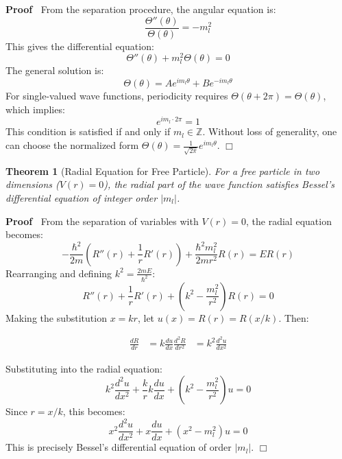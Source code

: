 \documentclass{article}
\newenvironment{proof}{\noindent\textbf{Proof\ }}{\hspace*{\fill}$\Box$\medskip}
\newtheorem{theorem}{Theorem}
\begin{document}
\begin{proof}
  From the separation procedure, the angular equation is:
  \begin{equation}
    \frac{\Theta'' (\theta)}{\Theta (\theta)} = - m_l^2
  \end{equation}
  This gives the differential equation:
  \begin{equation}
    \Theta'' (\theta) + m_l^2 \Theta (\theta) = 0
  \end{equation}
  The general solution is:
  \begin{equation}
    \Theta (\theta) = Ae^{im_l \theta} + Be^{- im_l \theta}
  \end{equation}
  For single-valued wave functions, periodicity requires $\Theta (\theta + 2
  \pi) = \Theta (\theta)$, which implies:
  \begin{equation}
    e^{im_l \cdot 2 \pi} = 1
  \end{equation}
  This condition is satisfied if and only if $m_l \in \mathbb{Z}$. Without
  loss of generality, one can choose the normalized form $\Theta (\theta) =
  \frac{1}{\sqrt{2 \pi}} e^{im_l \theta}$.
\end{proof}

\begin{theorem}
  [Radial Equation for Free Particle] For a free particle in two dimensions
  ($V (r) = 0$), the radial part of the wave function satisfies Bessel's
  differential equation of integer order $|m_l |$.
\end{theorem}

\begin{proof}
  From the separation of variables with $V (r) = 0$, the radial equation
  becomes:
  \begin{equation}
    - \frac{\hbar^2}{2 m}  \left( R'' (r) + \frac{1}{r} R' (r) \right) +
    \frac{\hbar^2 m_l^2}{2 mr^2} R (r) = ER (r)
  \end{equation}
  Rearranging and defining $k^2 = \frac{2 mE}{\hbar^2}$:
  \begin{equation}
    R'' (r) + \frac{1}{r} R' (r) + \left( k^2 - \frac{m_l^2}{r^2} \right) R
    (r) = 0
  \end{equation}
  Making the substitution $x = kr$, let $u (x) = R (r) = R (x / k)$. Then:
  
  \begin{align}
    \frac{dR}{dr} & = k \frac{du}{dx}  \frac{d^2 R}{dr^2} & = k^2  \frac{d^2
    u}{dx^2} 
  \end{align}
  
  Substituting into the radial equation:
  \begin{equation}
    k^2  \frac{d^2 u}{dx^2} + \frac{k}{r} k \frac{du}{dx} + \left( k^2 -
    \frac{m_l^2}{r^2} \right) u = 0
  \end{equation}
  Since $r = x / k$, this becomes:
  \begin{equation}
    x^2  \frac{d^2 u}{dx^2} + x \frac{du}{dx} + (x^2 - m_l^2) u = 0
  \end{equation}
  This is precisely Bessel's differential equation of order $|m_l |$.
\end{proof}
\end{document}
